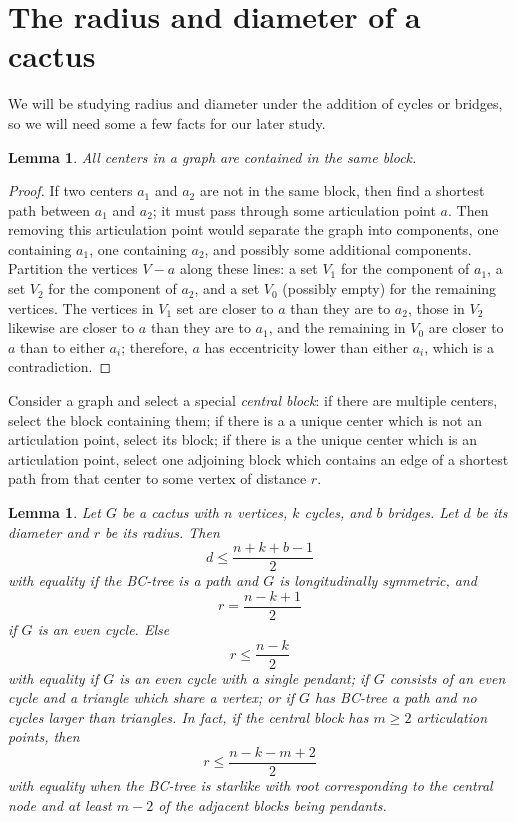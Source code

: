 \documentclass{amsart}
\newtheorem{lemma}[thm]{Lemma}
\theoremstyle{definition}
\begin{document}
\section{The radius and diameter of a cactus}\label{sec:rd_lemmata}


We will be studying radius and diameter under the addition of cycles or bridges, so we will need some a few facts for our later study. %

\begin{lemma}\label{lemma:centers}
All centers in a graph are contained in the same block.
\end{lemma}

\begin{proof}
If two centers $a_1$ and $a_2$ are not in the same block, then find a shortest path between $a_1$ and $a_2$; it must pass through some articulation point $a$. Then removing this articulation point would separate the graph into components, one containing $a_1$, one containing $a_2$, and possibly some additional components. Partition the vertices $V-a$ along these lines: a set $V_1$ for the component of $a_1$, a set $V_2$ for the component of $a_2$, and a set $V_0$ (possibly empty) for the remaining vertices. The vertices in $V_1$ set are closer to $a$ than they are to $a_2$, those in $V_2$ likewise are closer to $a$ than they are to $a_1$, and the remaining in $V_0$ are closer to $a$ than to either $a_i$; therefore, $a$ has eccentricity lower than either $a_i$, which is a contradiction.
\end{proof}

Consider a graph and select a special \emph{central block}: if there are multiple centers, select the block containing them; if there is a a unique center which is not an articulation point, select its block; if there is a the unique center which is an articulation point, select one adjoining block which contains an edge of a shortest path from that center to some vertex of distance $r$. 

\begin{lemma}\label{lemma:rd_vs_n}
Let $G$ be a cactus with $n$ vertices, $k$ cycles, and $b$ bridges. Let $d$ be its diameter and $r$ be its radius. Then
\[d \leq \frac{n+k+b-1}{2}\]
with equality if the BC-tree is a path and $G$ is longitudinally symmetric, and
\[r = \frac{n-k+1}{2}\]
if $G$ is an even cycle. Else 
\[r \leq \frac{n-k}{2}\]
with equality if $G$ is an even cycle with a single pendant; if $G$ consists of an even cycle and a triangle which share a vertex; or if $G$ has BC-tree a path and no cycles larger than triangles. In fact, if the central block has $m \geq 2$ articulation points, then 
\[r \leq \frac{n-k-m+2}{2}\]
with equality when the BC-tree is starlike with root corresponding to the central node and at least $m-2$ of the adjacent blocks being pendants.
\end{lemma}
\end{document}
